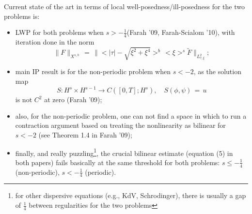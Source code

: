 \documentclass[12pt,reqno]{amsart}
\numberwithin{equation}{section}  %
\numberwithin{figure}{section}
\theoremstyle{plain}
\theoremstyle{definition}
\theoremstyle{remark}
\begin{document}
Current state of the art in terms of local well-posedness/ill-posedness for the two problems is:
\begin{itemize}
  \item LWP for both problems when $s>-\frac 14$(Farah '09, Farah-Scialom '10), with iteration done in
    the norm
    \[
    \|F\|_{X^{s,b}}\,=\,\|<|\tau|-\sqrt{\xi^2+\xi^4}>^b\,<\xi>^s \tilde{F}\|_{L^2_{\tau,\xi}};
    \]

  \item main IP result is for the non-periodic problem when $s<-2$, as the solution map 
    \[
    S: H^s\times H^{s-1} \to C([0,T]; H^s), \quad
    S(\phi,\psi)\,=\,u
    \]
    is not $C^2$ at zero (Farah '09);

  \item also, for the non-periodic problem, one can not find a space in which to run a contraction argument based on treating the nonlinearity as bilinear for $s<-2$ (see Theorem 1.4 in Farah '09);

  \item finally, and really puzzling\footnote{for other dispersive equations (e.g., KdV, Schrodinger), there is usually a gap of $\frac 14$ between regularities for the two problems}, the crucial bilinear estimate (equation (5) in both papers) fails basically at the same threshold for both problems: $s\leq -\frac 14$ (non-periodic), $s<-\frac{1}{4}$ (periodic).
\end{itemize}
\end{document}

